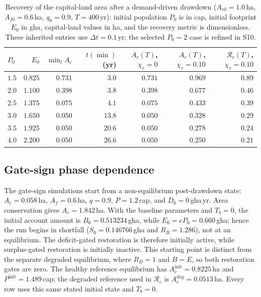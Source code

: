 \documentclass[11pt,a4paper]{article}
\begin{document}
\begin{table}[htbp]
\centering\small
\caption{Recovery of the capital-land area after a demand-driven drawdown ($A_{c0}=1.0$\,ha, $A_{f0}=0.6$\,ha, $q_0=0.9$, $T=400$\,yr): initial population $P_0$ is in cap, initial footprint $E_0$ in gha, capital-land values in ha, and the recovery metric is dimensionless. These inherited entries use $\Delta t=0.1$\,yr; the selected $P_0=2$ case is refined in S10.}
\label{tab:si_recovery}
\begin{tabular}{l r r r r r r}
\toprule
$P_0$ & $E_0$ & $\min_tA_c$ & $t(\min)$ (yr) & $A_c(T)$, $\chi_r=0$ & $A_c(T)$, $\chi_r=0.10$ & $\mathcal R_c(T)$, $\chi_r=0.10$ \\
\midrule
$1.5$ & $0.825$ & $0.731$ & $3.0$ & $0.731$ & $0.969$ & $0.89$ \\
$2.0$ & $1.100$ & $0.398$ & $3.8$ & $0.398$ & $0.677$ & $0.46$ \\
$2.5$ & $1.375$ & $0.075$ & $4.1$ & $0.075$ & $0.433$ & $0.39$ \\
$3.0$ & $1.650$ & $0.050$ & $13.8$ & $0.050$ & $0.328$ & $0.29$ \\
$3.5$ & $1.925$ & $0.050$ & $20.6$ & $0.050$ & $0.278$ & $0.24$ \\
$4.0$ & $2.200$ & $0.050$ & $26.6$ & $0.050$ & $0.250$ & $0.21$ \\
\bottomrule
\end{tabular}
\end{table}

\subsection{Gate-sign phase dependence}\label{si:gates}

The gate-sign simulations start from a non-equilibrium post-drawdown state: $A_c=0.058$\,ha, $A_f=0.6$\,ha, $q=0.9$, $P=1.2$\,cap, and $D_0=0$\,gha\,yr. Area conservation gives $A_r=1.842$\,ha. With the baseline parameters and $T_b=0$, the initial account amount is $B_0=0.513234$\,gha, while $E_0=eP_0=0.660$\,gha; hence the run begins in shortfall ($S_0=0.146766$\,gha and $R_B=1.286$), not at an equilibrium. The deficit-gated restoration is therefore initially active, while surplus-gated restoration is initially inactive. This starting point is distinct from the separate degraded equilibrium, where $R_B=1$ and $B=E$, so both restoration gates are zero. The healthy reference equilibrium has $A_c^{\mathrm{init}}=0.8225$\,ha and $P^{\mathrm{init}}=1.489$\,cap; the degraded reference used in $\mathcal R_c$ is $A_c^{\mathrm{deg}}=0.0513$\,ha. Every row uses this same stated initial state and $T_b=0$.
\end{document}
